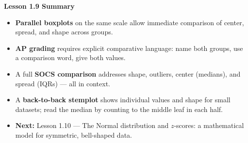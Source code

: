 \documentclass[aspectratio=169, 11pt]{beamer}
\begin{document}
{
\begin{frame}[plain]
  \vspace{1.5cm}
  \hspace{0.55cm}%
  \begin{minipage}{0.9\textwidth}
    {\color{goldacc}\bfseries\large Lesson 1.9 Summary}\\[0.8cm]
    \small
    \begin{itemize}\setlength{\itemsep}{0.5em}
      \item {\color{white} \textbf{Parallel boxplots} on the same scale allow immediate
            comparison of center, spread, and shape across groups.}
      \item {\color{white} \textbf{AP grading} requires explicit comparative language:
            name both groups, use a comparison word, give both values.}
      \item {\color{white} A full \textbf{SOCS comparison} addresses shape, outliers,
            center (medians), and spread (IQRs) --- all in context.}
      \item {\color{white} A \textbf{back-to-back stemplot} shows individual values
            and shape for small datasets; read the median by counting to the
            middle leaf in each half.}
      \item {\color{skymid} \textbf{Next:} Lesson 1.10 --- The Normal distribution
            and $z$-scores: a mathematical model for symmetric, bell-shaped data.}
    \end{itemize}
  \end{minipage}
\end{frame}
}
\end{document}
